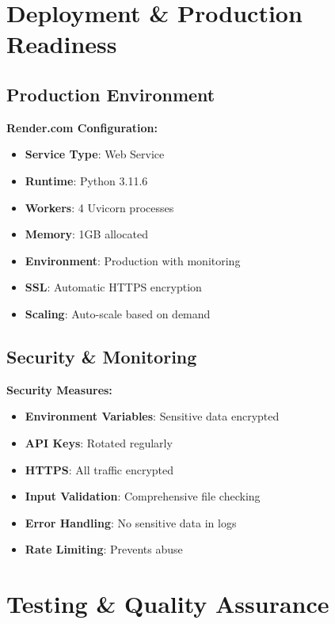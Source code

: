 \documentclass[11pt]{article}
\begin{document}
\section*{Deployment \& Production Readiness}

\subsection*{Production Environment}

\begin{deploybox}
\textbf{Render.com Configuration:}
\begin{itemize}
    \item \textbf{Service Type}: Web Service
    \item \textbf{Runtime}: Python 3.11.6
    \item \textbf{Workers}: 4 Uvicorn processes
    \item \textbf{Memory}: 1GB allocated
    \item \textbf{Environment}: Production with monitoring
    \item \textbf{SSL}: Automatic HTTPS encryption
    \item \textbf{Scaling}: Auto-scale based on demand
\end{itemize}
\end{deploybox}

\subsection*{Security \& Monitoring}

\begin{deploybox}
\textbf{Security Measures:}
\begin{itemize}
    \item \textbf{Environment Variables}: Sensitive data encrypted
    \item \textbf{API Keys}: Rotated regularly
    \item \textbf{HTTPS}: All traffic encrypted
    \item \textbf{Input Validation}: Comprehensive file checking
    \item \textbf{Error Handling}: No sensitive data in logs
    \item \textbf{Rate Limiting}: Prevents abuse
\end{itemize}
\end{deploybox}

\section*{Testing \& Quality Assurance}
\end{document}
